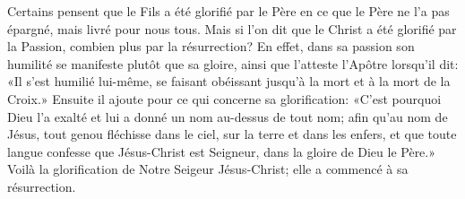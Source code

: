 Certains pensent que le Fils a été glorifié par le Père
	en ce que le Père ne l’a pas épargné, mais livré pour nous tous.
Mais si l’on dit que le Christ a été glorifié par la Passion,
	combien plus par la résurrection?
En effet, dans sa passion son humilité se manifeste plutôt que sa gloire,
	ainsi que l’atteste l’Apôtre lorsqu’il dit:
	«Il s’est humilié lui-même,
	se faisant obéissant jusqu’à la mort et à la mort de la Croix.»
Ensuite il ajoute pour ce qui concerne sa glorification:
	«C’est pourquoi Dieu l’a exalté
	et lui a donné un nom au-dessus de tout nom;
	afin qu’au nom de Jésus, tout genou fléchisse
	dans le ciel, sur la terre et dans les enfers,
	et que toute langue confesse que Jésus-Christ est Seigneur,
	dans la gloire de Dieu le Père.»
Voilà la glorification de Notre Seigeur Jésus-Christ;
	elle a commencé à sa résurrection.
